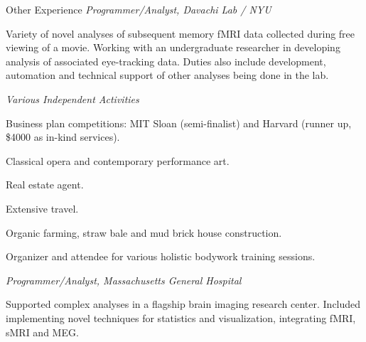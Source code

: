 \begin{rubric}{Other Experience}
\entry*[2005--2006] \emph{Programmer/Analyst, Davachi Lab / NYU}
    \par Variety of novel analyses of subsequent memory fMRI data collected
    during free viewing of a movie.  Working with an undergraduate researcher in
    developing analysis of associated eye-tracking data.  Duties also include
    development, automation and technical support of other analyses being done
    in the lab.

\entry*[2003--2004] \emph{Various Independent Activities}
\begin{compactitem} 
    \item Business plan competitions:  MIT Sloan (semi-finalist) and Harvard
        (runner up, \$4000 as in-kind services). 
    \item Classical opera and contemporary performance art.
    \item Real estate agent. 
    \item Extensive travel. 
    \item Organic farming, straw bale and mud brick house construction. 
    \item Organizer and attendee for various holistic bodywork training sessions. 
\end{compactitem}

\entry*[2002] \emph{Programmer/Analyst, Massachusetts General Hospital}
    \par Supported complex analyses in a flagship brain imaging research center.
    Included implementing novel techniques for statistics and visualization,
    integrating fMRI, sMRI and MEG.

\end{rubric}
